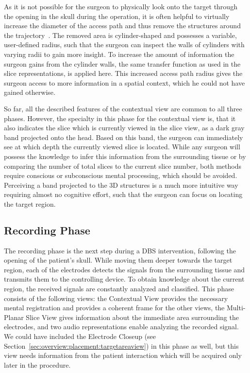 \documentclass[journal]{vgtc}                %
\begin{document}
As it is not possible for the surgeon to physically look onto the target through the opening in the skull during the operation, it is often helpful to virtually increase the diameter of the access path and thus remove the structures around the trajectory~\cite{Weiskopf2002,Rieder2008}. The removed area is cylinder-shaped and possesses a variable, user-defined radius, such that the surgeon can inspect the walls of cylinders with varying radii to gain more insight. To increase the amount of information the surgeon gains from the cylinder walls, the same transfer function as used in the slice representations, is applied here. This increased access path radius gives the surgeon access to more information in a spatial context, which he could not have gained otherwise.

So far, all the described features of the contextual view are common to all three phases. However, the specialty in this phase for the contextual view is, that it also indicates the slice which is currently viewed in the slice view, as a dark gray band projected onto the head. Based on this band, the surgeon can immediately see at which depth the currently viewed slice is located. While any surgeon will possess the knowledge to infer this information from the surrounding tissue or by comparing the number of total slices to the current slice number, both methods require conscious or subconscious mental processing, which should be avoided. Perceiving a band projected to the 3D structures is a much more intuitive way requiring almost no cognitive effort, such that the surgeon can focus on locating the target region.


\subsection{Recording Phase}\label{sec:overview:recording}
The recording phase is the next step during a DBS intervention, following the opening of the patient's skull. While moving them deeper towards the target region, each of the electrodes detects the signals from the surrounding tissue and transmits them to the controlling device. To obtain knowledge about the current region, the received signals are constantly analyzed and classified. This phase consists of the following views: the Contextual View provides the necessary mental registration and provides a coherent frame for the other views, the Multi-Planar Slice View gives information about the immediate area surrounding the electrodes, and two audio representations enable analyzing the recorded signal. We could have included the Electrode Closeup (see Section~\ref{sec:overview:placement:targetareaview}) in this phase as well, but this view needs information from the patient interaction which will be acquired only later in the procedure.
\end{document}
